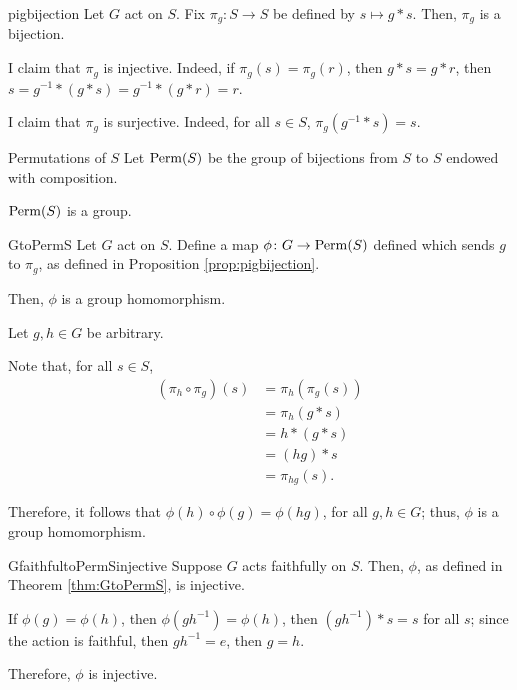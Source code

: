 
\begin{prop}{}{pigbijection}
  Let \(G\) act on \(S\). Fix \(\pi_g \colon S \to S\) be defined by \(s \mapsto g * s\). Then, \(\pi_g\) is a bijection.
\end{prop}

\begin{dem}{}{}
  I claim that \(\pi_g\) is injective. Indeed, if \(\pi_g(s) = \pi_g(r)\), then \(g * s = g * r\), then \(s = g^{-1} * (g * s) = g^{-1} * (g * r) = r\).

  I claim that \(\pi_g\) is surjective. Indeed, for all \(s \in S\), \(\pi_g(g^{-1} * s) = s\).
\end{dem}

\begin{defn}{Permutations of \(S\)}{}
  Let \(\operatorname{Perm}(S)\) be the group of bijections from \(S\) to \(S\) endowed with composition.
\end{defn}

\begin{prop}{}{}
  \(\operatorname{Perm}(S)\) is a group.
\end{prop}

\begin{thm}{}{GtoPermS}
  Let \(G\) act on \(S\). Define a map \(\phi \colon G \to \operatorname{Perm}(S)\) defined which sends \(g\) to \(\pi_g\), as defined in Proposition \ref{prop:pigbijection}.

  Then, \(\phi\) is a group homomorphism.
\end{thm}

\begin{dem}{}{}
  Let \(g, h \in G\) be arbitrary.

  Note that, for all \(s \in S\), 
  \begin{align*}
    (\pi_h \circ \pi_g)(s) &= \pi_h(\pi_g(s)) \\
                           &= \pi_h(g * s) \\
                           &= h * (g * s) \\
                           &= (hg) * s \\
                           &= \pi_{hg}(s).
  \end{align*}

  Therefore, it follows that \(\phi(h) \circ \phi(g) = \phi(hg)\), for all \(g, h \in G\); thus, \(\phi\) is a group homomorphism.
\end{dem}

\begin{thm}{}{GfaithfultoPermSinjective}
  Suppose \(G\) acts faithfully on \(S\). Then, \(\phi\), as defined in Theorem \ref{thm:GtoPermS}, is injective.
\end{thm}

\begin{dem}{}{}
  If \(\phi(g) = \phi(h)\), then \(\phi(gh^{-1}) = \phi(h)\), then \((gh^{-1})*s = s\) for all \(s\); since the action is faithful, then  \(gh^{-1} = e\), then \(g = h\).

  Therefore, \(\phi\) is injective.
\end{dem}
